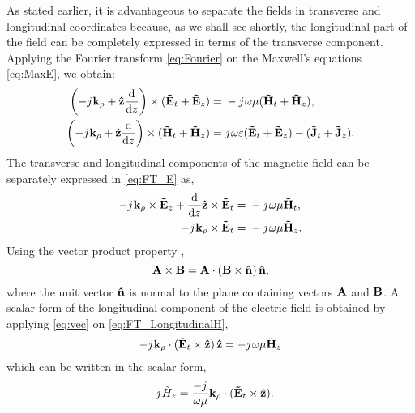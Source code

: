 As stated earlier, it is advantageous to separate the fields in transverse and longitudinal coordinates because, as we shall see shortly, the longitudinal part of the field can be completely expressed in terms of the transverse component. Applying the Fourier transform \eqref{eq:Fourier} on the Maxwell's equations \eqref{eq:MaxE}, we obtain:
%
\begin{subequations}
  \begin{align}
    \left(-{j}\mkern1mu \mathbf{k}_{\rho} + \mathbf{\hat{z}} \dv{}{z} \right)\times (\mathbf{\tilde{E}}_t + \mathbf{\tilde{E}}_z)  ={}& -{j}\mkern1mu \omega \mu (\mathbf{\tilde{H}}_t + \mathbf{\tilde{H}}_z),
    \label{eq:FT_E}\\
    \left(-{j}\mkern1mu \mathbf{k}_{\rho} + \mathbf{\hat{z}} \dv{}{z} \right)\times (\mathbf{\tilde{H}}_t + \mathbf{\tilde{H}}_z)  ={}& {j}\mkern1mu \omega \varepsilon (\mathbf{\tilde{E}}_t + \mathbf{\tilde{E}}_z) -
    (\mathbf{\tilde{J}}_t + \mathbf{\tilde{J}}_z).
    \label{eq:FT_H}
  \end{align}
  \label{eq:FT_EH}%
\end{subequations}
%
The transverse and longitudinal components of the magnetic field can be separately expressed in \eqref{eq:FT_E} as,
%
\begin{subequations}
  \begin{align}
    -{j}\mkern1mu \mathbf{k}_{\rho} \times \mathbf{\tilde{E}}_z +
    \dv{}{z}\mathbf{\hat{z}} \times \mathbf{\tilde{E}}_t ={}&
    -{j}\mkern1mu \omega \mu \mathbf{\tilde{H}}_t,
    \label{eq:FT_TransverseH}\\
    -{j}\mkern1mu \mathbf{k}_{\rho} \times \mathbf{\tilde{E}}_t ={}&
    -{j}\mkern1mu \omega \mu \mathbf{\tilde{H}}_z.
    \label{eq:FT_LongitudinalH}
  \end{align}
  \label{eq:FT_TLH}%
\end{subequations}
%
Using the vector product property \cite[p. 117]{Fang2010},
%
\begin{equation}
  \mathbf{A} \times \mathbf{B} =\mathbf{A} \cdot (\mathbf{B} \times \mathbf{\hat{n}}) \, \mathbf{\hat{n}},
  \label{eq:vec}
\end{equation}
%
where the unit vector $\mathbf{\hat{n}}$ is normal to the plane containing vectors $\mathbf{A}$ and $\mathbf{B}$. A scalar form of the longitudinal component of the electric field is obtained by applying \eqref{eq:vec} on \eqref{eq:FT_LongitudinalH},
%
\begin{equation}
  - {j}\mkern1mu \mathbf{k}_{\rho} \cdot (\mathbf{\tilde{E}}_t \times \mathbf{\hat{z}}) \, \mathbf{\hat{z}} =
  - {j}\mkern1mu \omega \mu \mathbf{\tilde{H}}_z
  \label{eq:FT_vectorLH}
\end{equation}
%
which can be written in the scalar form,
%
\begin{equation}
  - {j}\mkern1mu \tilde{H}_z = \frac{- {j}\mkern1mu}{\omega \mu}
  \mathbf{k}_{\rho} \cdot (\mathbf{\tilde{E}}_t \times \mathbf{\hat{z}}).
  \label{eq:sLH}
\end{equation}
